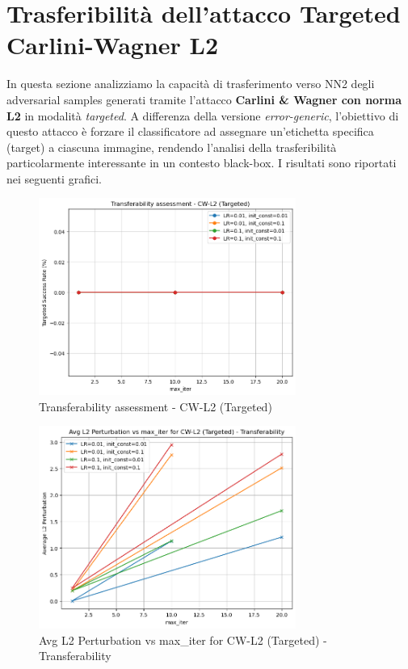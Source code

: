     \section{Trasferibilità dell'attacco Targeted Carlini-Wagner L2}
        In questa sezione analizziamo la capacità di trasferimento verso NN2 degli adversarial samples generati tramite l’attacco \textbf{Carlini \& Wagner con norma L2} in modalità \textit{targeted}. A differenza della versione \textit{error-generic}, l’obiettivo di questo attacco è forzare il classificatore ad assegnare un’etichetta specifica (target) a ciascuna immagine, rendendo l’analisi della trasferibilità particolarmente interessante in un contesto black-box.
        I risultati sono riportati nei seguenti grafici.
        
        \begin{figure}[H]
          \centering
          \includegraphics[width=0.75\textwidth]{images/cwtrastargl2.png}
          \caption{Transferability assessment - CW-L2 (Targeted)}
        \end{figure}
        
        \begin{figure}[H]
          \centering
          \includegraphics[width=0.75\textwidth]{images/cwtrastargl2-1.png}
          \caption{Avg L2 Perturbation vs max\_iter for CW-L2 (Targeted) - Transferability}
        \end{figure}
        
